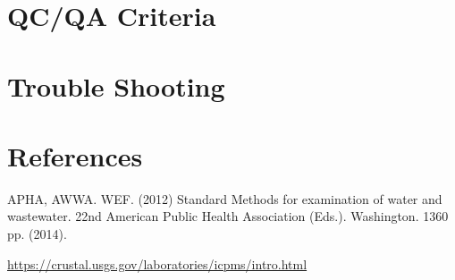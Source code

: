 \documentclass[12pt]{../SOP3_beta}
\begin{document}
\section{QC/QA Criteria}

\section{Trouble Shooting}

\section{References}

\NP APHA, AWWA. WEF. (2012) Standard Methods for examination of water and wastewater. 22nd American Public Health Association (Eds.). Washington. 1360 pp. (2014).

\url{https://crustal.usgs.gov/laboratories/icpms/intro.html}
\end{document}
